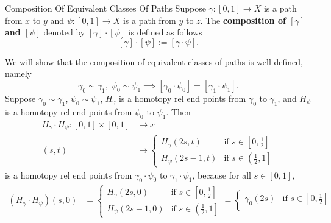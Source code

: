 \documentclass{report}
\begin{document}
\begin{definition}{Composition Of Equivalent Classes Of Paths}{}
	Suppose $\gamma: [0,1] \longrightarrow X$ is a path from $x$ to $y$ and $\psi: [0,1] \longrightarrow X$ is a path from $y$ to $z$. The \textbf{composition of $[\gamma]$ and $[\psi]$} denoted by $[\gamma]\cdot [\psi]$ is defined as follows
	\[
		[\gamma]\cdot [\psi]:=[\gamma\cdot \psi].
	\]
\end{definition}

\begin{prf}
	We will show that the composition of equivalent classes of paths is                                                                  well-defined, namely
	\[
		\gamma_0\sim \gamma_1,\;\psi_0\sim \psi_1\implies [\gamma_0\cdot \psi_0] = [\gamma_1\cdot\psi_1].
	\]
	Suppose $\gamma_0\sim \gamma_1$, $\psi_0\sim \psi_1$, $H_{\gamma}$ is a homotopy rel end points from $\gamma_0$ to $\gamma_1$, and $H_{\psi}$ is a homotopy rel end points from $\psi_0$ to $\psi_1$. Then
	\begin{align*}
		H_{\gamma}\cdot H_{\psi}:[0,1]\times [0,1] & \longrightarrow x                                                                                 \\
		(s,t)                                      & \longmapsto \begin{cases}
			                                                         H_{\gamma}(2s, t) & \text{if }s\in\left[0,\frac{1}{2}\right]              \\
			                                                         H_{\psi}(2s-1, t) & \text{if }s\in\left(\left.\frac{1}{2},1\right]\right.
		                                                         \end{cases}
	\end{align*}
	is a homotopy rel end points from $\gamma_0\cdot\psi_0$ to $\gamma_1\cdot\psi_1$, because for all $s\in[0,1]$,
	\[\begin{aligned}
			\left(H_{\gamma}\cdot H_{\psi}\right)(s, 0) & =\begin{cases}
				                                               H_{\gamma}(2s, 0) & \text{if }s\in\left[0,\frac{1}{2}\right]              \\
				                                               H_{\psi}(2s-1, 0) & \text{if }s\in\left(\left.\frac{1}{2},1\right]\right.
			                                               \end{cases}=\begin{cases}
				                                                           \gamma_0(2s) & \text{if }s\in\left[0,\frac{1}{2}\right]              \\

\end{cases}
\end{aligned}\]
\end{prf}
\end{document}
